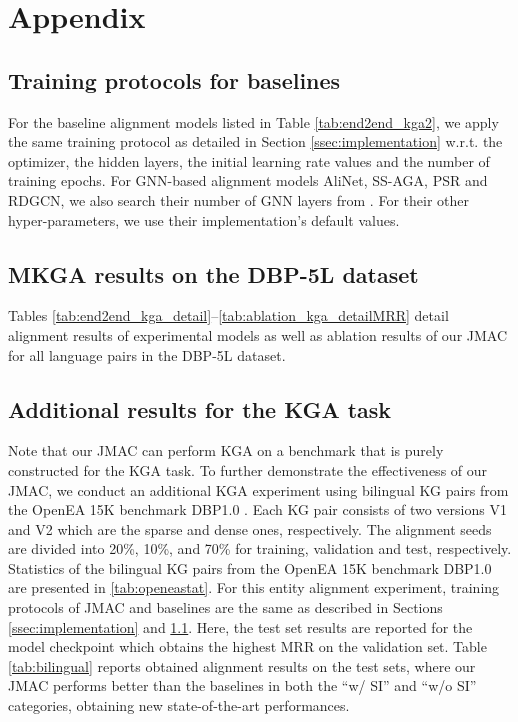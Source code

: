 \documentclass[11pt]{article}
\begin{document}
\appendix 

\section{Appendix}
\label{sec:appendix}


\subsection{Training protocols for baselines}\label{ssec:implementationbl}
For the baseline alignment models listed in Table \ref{tab:end2end_kga2}, we apply the same training protocol as detailed in Section \ref{ssec:implementation} w.r.t. the optimizer, the hidden layers, the initial learning rate values and the number of training epochs. For GNN-based alignment models {AliNet}, {SS-AGA}, PSR and {RDGCN}, we also search their number of GNN layers from . For their other hyper-parameters, we use their implementation's default values. 


\subsection{MKGA results on the DBP-5L dataset}  
Tables \ref{tab:end2end_kga_detail}--\ref{tab:ablation_kga_detailMRR} detail alignment results of experimental models as well as ablation  results of our JMAC for all language pairs in the DBP-5L dataset.


\subsection{Additional results for the KGA task} 
Note that our JMAC can perform KGA on a benchmark that is purely constructed for the KGA task. To further demonstrate the effectiveness of our JMAC, we conduct an additional KGA experiment using bilingual KG pairs from the OpenEA 15K benchmark DBP1.0 \cite{sun2020benchmarking}.  
Each KG pair consists of two versions V1 and V2 which are the sparse and dense ones, respectively. The alignment seeds are divided into 20\%, 10\%, and 70\% for training, validation and test, respectively. Statistics of the bilingual KG pairs from the OpenEA 15K benchmark DBP1.0 are presented in \autoref{tab:openeastat}.  For this entity alignment experiment, training protocols of JMAC and baselines are the same as described in Sections \ref{ssec:implementation} and \ref{ssec:implementationbl}. Here, the test set results are reported for the model checkpoint which obtains the highest MRR on the validation set. Table \ref{tab:bilingual} reports obtained alignment results on the test sets, where our JMAC performs better than the baselines in both the ``w/ SI'' and ``w/o SI'' categories, obtaining new state-of-the-art performances.   
\end{document}
